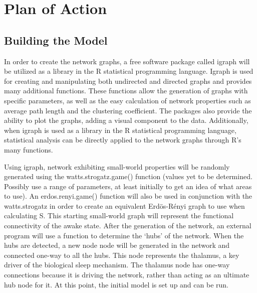 \documentclass[11pt,letterpaper,doublespacing,titlepage]{article}
\begin{document}
\section{Plan of Action}
\subsection{Building the Model}
\par
In order to create the network graphs, a free software package called igraph will be utilized as a library in the R statistical programming language. Igraph is used for creating and manipulating both undirected and directed graphs and provides many additional functions. These functions allow the generation of graphs with specific parameters, as well as the easy calculation of network properties such as average path length and the clustering coefficient. The packages also provide the ability to plot the graphs, adding a visual component to the data. Additionally, when igraph is used as a library in the R statistical programming language, statistical analysis can be directly applied to the network graphs through R’s many functions. 
\par
Using igraph, network exhibiting small-world properties will be randomly generated using the watts.strogatz.game() function (values yet to be determined. Possibly use a range of parameters, at least initially to get an idea of what areas to use). An erdos.renyi.game() function will also be used in conjunction with the watts.strogatz in order to create an equivalent Erdös-Rényi graph to use when calculating S. This starting small-world graph will represent the functional connectivity of the awake state. After the generation of the network, an external program will use a function to determine the ‘hubs’ of the network. When the hubs are detected, a new node node will be generated in the network and connected one-way to all the hubs. This node represents the thalamus, a key driver of the biological sleep mechanism. The thalamus node has one-way connections because it is driving the network, rather than acting as an ultimate hub node for it. At this point, the initial model is set up and can be run.
\end{document}
